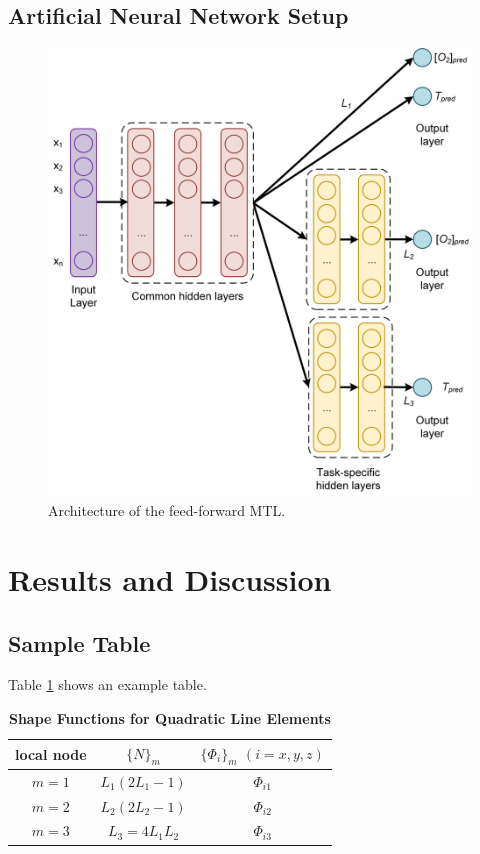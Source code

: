 \documentclass[9pt,twocolumn,twoside,pdftex]{optica}
\begin{document}
\subsection{Artificial Neural Network Setup}
\label{NN}


\begin{figure}[htbp]
\centering
\includegraphics[width=9 cm]{NN_MTL_O2_T.png}
\caption{Architecture of the feed-forward MTL.}
\label{fig:NN_MTL_O2_T}
\end{figure}

\section{Results and Discussion}



\subsection{Sample Table}

Table \ref{tab:shape-functions} shows an example table.

\begin{table}[htbp]
\centering
\caption{\bf Shape Functions for Quadratic Line Elements}
\begin{tabular}{ccc}
\hline
local node & $\{N\}_m$ & $\{\Phi_i\}_m$ $(i=x,y,z)$ \\
\hline
$m = 1$ & $L_1(2L_1-1)$ & $\Phi_{i1}$ \\
$m = 2$ & $L_2(2L_2-1)$ & $\Phi_{i2}$ \\
$m = 3$ & $L_3=4L_1L_2$ & $\Phi_{i3}$ \\
\hline
\end{tabular}
  \label{tab:shape-functions}
\end{table}
\end{document}
